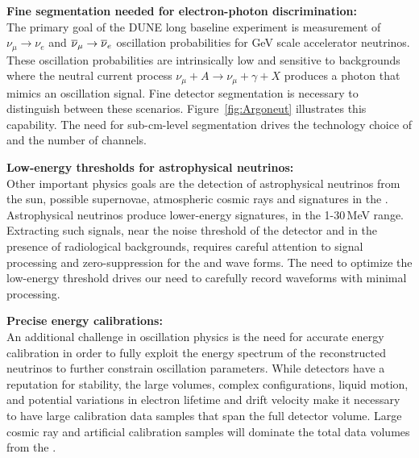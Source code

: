 \documentclass[../main-v1.tex]{subfiles}
\begin{document}
\begin{description}
\item{\bf Fine segmentation needed for electron-photon discrimination: \\}   The primary goal of the DUNE long baseline experiment is measurement of $\nu_\mu\rightarrow\nu_e$ and $\overline{\nu}_\mu\rightarrow\overline{\nu}_e$
oscillation probabilities for GeV scale accelerator neutrinos.   These oscillation probabilities are intrinsically low and sensitive to backgrounds where the neutral current process  $\nu_\mu+A\rightarrow\nu_\mu+\gamma+X$
produces a photon that %
mimics an oscillation signal.  Fine detector segmentation is necessary to distinguish between these scenarios. Figure~\ref{fig:Argoneut} illustrates this capability. The need for sub-cm-level segmentation drives the technology choice of  and %
the number of channels.   
\item{\bf Low-energy thresholds for astrophysical neutrinos: \\}
Other important physics goals are the detection of astrophysical neutrinos from the sun, possible supernovae, atmospheric cosmic rays and %
 signatures in the .  Astrophysical neutrinos produce lower-energy signatures, in the 1-30\,MeV range. Extracting such signals, near the noise threshold of the detector and in the presence of radiological backgrounds, requires careful attention to signal processing and zero-suppression for the   and  wave forms.  The need to optimize the low-energy threshold drives our need to carefully record waveforms with minimal processing. 

\item{\bf Precise energy calibrations:\\}
An additional challenge in oscillation physics is the need for accurate energy calibration in order to fully %
exploit the energy spectrum of the reconstructed neutrinos to further constrain oscillation parameters. While  detectors have a reputation for stability, the large volumes, complex \efield configurations, liquid motion, and potential variations in electron lifetime and drift velocity make it necessary to have large calibration data samples that span the full  detector volume.  Large cosmic ray and artificial calibration samples will dominate the total data volumes from the . 


\end{description}
\end{document}
